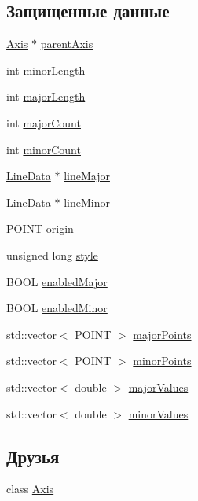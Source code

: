 \subsection*{Защищенные данные}
\begin{DoxyCompactItemize}
\item 
\hyperlink{class_axis}{Axis} $\ast$ \hyperlink{class_ticks_a1651670c18ed9ab64dc36f1a0f97f6c6}{parent\-Axis}
\item 
int \hyperlink{class_ticks_a8d5c6ae0f3a8795b19fb11b02a067965}{minor\-Length}
\item 
int \hyperlink{class_ticks_a1426fb6d7b814408f11f7e42c69cb043}{major\-Length}
\item 
int \hyperlink{class_ticks_a65f30db72cdc88055678f89403bac8ab}{major\-Count}
\item 
int \hyperlink{class_ticks_a2a253b2cc8b48bd9183cddfd10b52c17}{minor\-Count}
\item 
\hyperlink{class_line_data}{Line\-Data} $\ast$ \hyperlink{class_ticks_a124e38f88330158c049125e5beddf12b}{line\-Major}
\item 
\hyperlink{class_line_data}{Line\-Data} $\ast$ \hyperlink{class_ticks_a38664cd2dd23fc7f5cbe119119af8f69}{line\-Minor}
\item 
P\-O\-I\-N\-T \hyperlink{class_ticks_a316c176b6108e99b7327efa4e62c9276}{origin}
\item 
unsigned long \hyperlink{class_ticks_a26f1426254b2dbb52faf65e367c842d7}{style}
\item 
B\-O\-O\-L \hyperlink{class_ticks_a8dff4c03c15737ce84808492b0773dcd}{enabled\-Major}
\item 
B\-O\-O\-L \hyperlink{class_ticks_aa830dfc5ddac0215f342f134263033fe}{enabled\-Minor}
\item 
std\-::vector$<$ P\-O\-I\-N\-T $>$ \hyperlink{class_ticks_ae6233030c8eb29fb309d2d55c6d97f94}{major\-Points}
\item 
std\-::vector$<$ P\-O\-I\-N\-T $>$ \hyperlink{class_ticks_aad15b47014c3660f4e9299be607ef78c}{minor\-Points}
\item 
std\-::vector$<$ double $>$ \hyperlink{class_ticks_acb5d19b05c96d1d9bbc406ba1c366369}{major\-Values}
\item 
std\-::vector$<$ double $>$ \hyperlink{class_ticks_a2cc0e38cace3edc53a31e329781ba2de}{minor\-Values}
\end{DoxyCompactItemize}
\subsection*{Друзья}
\begin{DoxyCompactItemize}
\item 
class \hyperlink{class_ticks_a9c05b17b809103942e6d7089d28f6db9}{Axis}
\end{DoxyCompactItemize}
